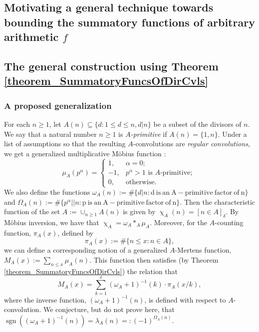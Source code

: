 \documentclass[11pt,reqno,a4letter]{article}
\numberwithin{figure}{section}
\numberwithin{table}{section}
\newcommand{\Iverson}[1]{\ensuremath{\left[#1\right]_{\delta}}}
\renewcommand{\chi}{\upchi}
\theoremstyle{plain}
\numberwithin{theorem}{section}
\theoremstyle{definition}
\begin{document}
\subsection{Motivating a general technique towards bounding the summatory functions of arbitrary arithmetic $f$} 

\subsection{The general construction using Theorem \ref{theorem_SummatoryFuncsOfDirCvls}} 

\subsubsection{A proposed generalization} 

For each $n \geq 1$, let $A(n) \subseteq \{d: 1 \leq d \leq n, d|n\}$ be a subset of the 
divisors of $n$. We say that a natural number $n \geq 1$ is \emph{$A$-primitive} if $A(n) = \{1, n\}$. 
Under a list of assumptions so that the resulting $A$-convolutions are \emph{regular convolutions}, 
we get a generalized multiplicative M\"obius function \cite[\S 2.2]{HANDBOOKNT-2004}: 
\[
\mu_A(p^{\alpha}) = \begin{cases} 
     1, & \alpha = 0; \\ 
     -1, & p^{\alpha} > 1\text{\ is $A$-primitive; } \\ 
     0, & \text{otherwise.}
     \end{cases} 
\]
We also define the functions $\omega_A(n) := \#\{d | n: \mathrm{d\ is\ an\ A-primitive\ factor\ of\ n}\}$ and 
$\Omega_A(n) := \#\{p^{\alpha} || n: \mathrm{p\ is\ an\ A-primitive\ factor\ of\ n}\}$. Then the characteristic 
function of the set $A := \cup_{n \geq 1} A(n)$ is given by $\chi_A(n) = \Iverson{n \in A}$. By M\"obius inversion, 
we have that $\chi_A = \omega_A \ast_A \mu_A$. Moreover, for the $A$-counting function, $\pi_A(x)$, defined by 
\[
\pi_A(x) := \#\{n \leq x: n \in A\}, 
\]
we can define a corresponding notion of a generalized $A$-Mertens function, $M_A(x) := \sum_{n \leq x} \mu_A(n)$. 
This function then satisfies (by Theorem \ref{theorem_SummatoryFuncsOfDirCvls}) the relation that 
\[
M_A(x) = \sum_{k=1}^{x} (\omega_A + 1)^{-1}(k) \cdot \pi_A(x/k), 
\]
where the inverse function, $(\omega_A + 1)^{-1}(n)$, is defined with respect to $A$-convolution. 
We conjecture, but do not prove here, that 
$\operatorname{sgn}((\omega_A + 1)^{-1}(n)) = \lambda_A(n) =: (-1)^{\Omega_A(n)}$. 
\end{document}
